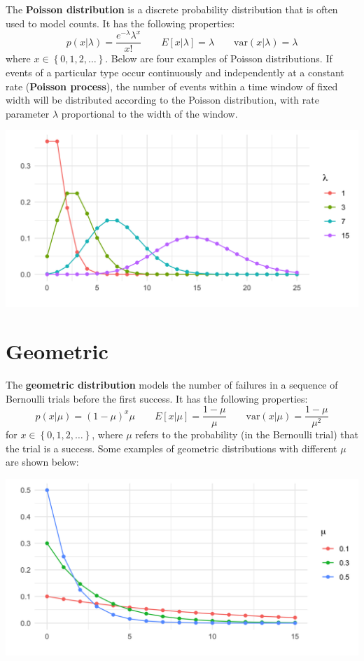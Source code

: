 The \textbf{Poisson distribution} is a discrete probability distribution that is often used to model counts. It has the following properties:
$$ p(x | \lambda) = \frac{e^{-\lambda} \lambda^x}{x!} \qquad E[x|\lambda] = \lambda \qquad \text{var}(x|\lambda) = \lambda $$
where $x \in \left\{0, 1, 2, \dots \right\}$. Below are four examples of Poisson distributions. If events of a particular type occur continuously and independently at a constant rate (\textbf{Poisson process}), the number of events within a time window of fixed width will be distributed according to the Poisson distribution, with rate parameter $\lambda$ proportional to the width of the window.

\begin{center}
\includegraphics[width=\textwidth]{img/l01-figure3a-poisson-lambda-change.png}
\end{center}

\section{Geometric}

The \textbf{geometric distribution} models the number of failures in a sequence of Bernoulli trials before the first success. It has the following properties:
$$ p(x|\mu) = (1-\mu)^x \mu \qquad E[x|\mu] = \frac{1-\mu}{\mu} \qquad \text{var}(x|\mu) = \frac{1-\mu}{\mu^2}  $$
for $x \in \left\{0, 1, 2, \dots \right\}$, where $\mu$ refers to the probability (in the Bernoulli trial) that the trial is a success. Some examples of geometric distributions with different $\mu$ are shown below: 
\begin{center}
\includegraphics[width=\textwidth]{img/l01-figure4-geometric-mu-change.png}
\end{center}

